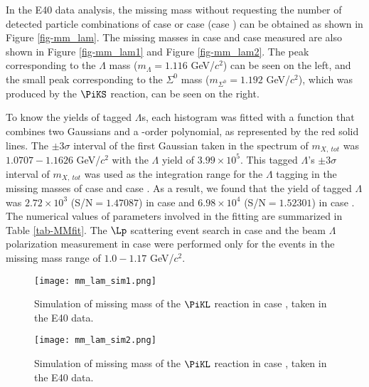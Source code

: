 In the E40 data analysis, the missing mass without requesting the number of detected particle combinations of case  or case  (case ) can be obtained as shown in Figure \ref{fig-mm_lam}. The missing masses in case  and case  measured are also shown in Figure \ref{fig-mm_lam1} and Figure \ref{fig-mm_lam2}. The peak corresponding to the $\Lambda$ mass ($m_{\Lambda} = 1.116$ GeV/$c^{2}$) can be seen on the left, and the small peak corresponding to the $\Sigma^{0}$ mass ($m_{\Sigma^{0}} = 1.192$ GeV/$c^{2}$), which was produced by the $\PiKS$ reaction, can be seen on the right. 

To know the yields of tagged $\Lambda$s, each histogram was fitted with a function that combines two Gaussians and a -order polynomial, as represented by the red solid lines. The $\pm3\sigma$ interval of the first Gaussian taken in the spectrum of $m_{X,\ tot}$ was $1.0707 - 1.1626$ GeV/$c^{2}$ with the $\Lambda$ yield of $3.99\times10^{5}$. This tagged $\Lambda$'s $\pm3\sigma$ interval of $m_{X,\ tot}$ was used as the integration range for the $\Lambda$ tagging in the missing masses of case  and case . As a result, we found that the yield of tagged $\Lambda$ was $2.72\times10^{3}$ (S/N$=1.47087$) in case  and $6.98\times10^{4}$ (S/N$=1.52301$) in case . The numerical values of parameters involved in the fitting are summarized in Table \ref{tab-MMfit}. The $\Lp$ scattering event search in case  and the beam $\Lambda$ polarization measurement in case  were performed only for the events in the missing mass range of $1.0 - 1.17$ GeV/$c^{2}$.

\begin{figure}[!h]
  \begin{minipage}[t]{0.48\columnwidth}
    \centering
    \texttt{[image: mm\_lam\_sim1.png]}
    \caption{Simulation of missing mass of the $\PiKL$ reaction in case , taken in the E40 data.}
    \label{fig-mm_lam_sim1}
  \end{minipage}
  \hspace{0.04\columnwidth} %
  \begin{minipage}[t]{0.48\columnwidth}
    \centering
    \texttt{[image: mm\_lam\_sim2.png]}
    \caption{Simulation of missing mass of the $\PiKL$ reaction in case , taken in the E40 data.}
    \label{fig-mm_lam_sim2}
  \end{minipage}
\end{figure}

